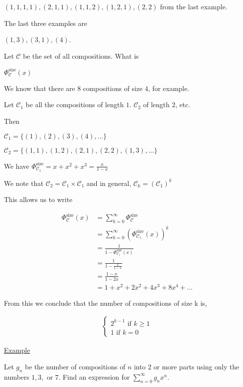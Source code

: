 \documentclass{article}
\begin{document}
$(1,1,1,1),(2,1,1),(1,1,2),(1,2,1),(2,2)$ from the last example.

The last three examples are

$(1,3),(3,1),(4)$.

Let $\mathcal{C}$ be the set of all compositions. What is

$\Phi_{\mathcal{C}}^{\text{size}}(x)$

We know that there are $8$ compositions of size $4$, for example. 

Let $\mathcal{C}_1$ be all the compositions of length $1$. $\mathcal{C}_2$ of length $2$, etc.

Then 

$\mathcal{C}_1 = \{(1),(2),(3),(4),\ldots\}$

$\mathcal{C}_2 = \{(1,1),(1,2),(2,1),(2,2),(1,3),\ldots\}$

We have $\Phi_{\mathcal{C}_1}^{\text{size}} = x + x^2 + x^3 = \frac{x}{1-x}$

We note that $\mathcal{C}_2 = \mathcal{C}_1 \times \mathcal{C}_1$ and in general, $\mathcal{C}_k = (\mathcal{C}_1)^k$

This allows us to write

\begin{align*}
    \Phi_{\mathcal{C}}^{\text{size}}(x) &= \sum_{k=0}^{\infty}\Phi_{\mathcal{C}}^{\text{size}} \\
    &= \sum_{k=0}^{\infty}(\Phi_{\mathcal{C}_1}^{\text{size}}(x))^k \\
    &= \frac{1}{1-\Phi_{\mathcal{C}_1}^{\text{size}}(x)} \\
    &= \frac{1}{1-\frac{x}{1-x}} \\
    &= \frac{1-x}{1-2x} \\
    &= 1 + x^2 + 2x^2 + 4x^3 + 8x^4 + \ldots
\end{align*}

From this we conclude that the number of compositions of size k is,

\begin{align*}
\begin{cases}
    2^{k-1} \text{ if } k \ge 1 \\
    1 \text{ if } k = 0
\end{cases}
\end{align*}


\underline{Example}

Let $g_n$ be the number of compositions of $n$ into $2$ or more parts using only the numbers $1, 3,$ or $7$. Find an expression for $\sum_{n=0}^{\infty}g_nx^n$.
\end{document}

